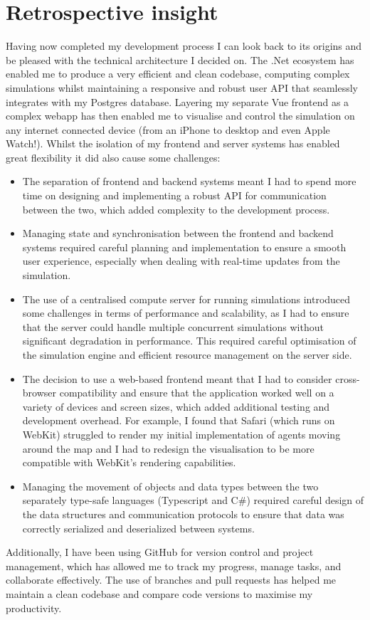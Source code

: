 \section{Retrospective insight}
Having now completed my development process I can look back to its origins and be pleased with the technical architecture I decided on. The .Net ecosystem has enabled me to produce a very efficient and clean codebase, computing complex simulations whilst maintaining a responsive and robust user API that seamlessly integrates with my Postgres database. Layering my separate Vue frontend as a complex webapp has then enabled me to visualise and control the simulation on any internet connected device (from an iPhone to desktop and even Apple Watch!). Whilst the isolation of my frontend and server systems has enabled great flexibility it did also cause some challenges: 
\begin{itemize}
    \item The separation of frontend and backend systems meant I had to spend more time on designing and implementing a robust API for communication between the two, which added complexity to the development process.
    \item Managing state and synchronisation between the frontend and backend systems required careful planning and implementation to ensure a smooth user experience, especially when dealing with real-time updates from the simulation.
    \item The use of a centralised compute server for running simulations introduced some challenges in terms of performance and scalability, as I had to ensure that the server could handle multiple concurrent simulations without significant degradation in performance. This required careful optimisation of the simulation engine and efficient resource management on the server side.
    \item The decision to use a web-based frontend meant that I had to consider cross-browser compatibility and ensure that the application worked well on a variety of devices and screen sizes, which added additional testing and development overhead. For example, I found that Safari (which runs on WebKit) struggled to render my initial implementation of agents moving around the map and I had to redesign the visualisation to be more compatible with WebKit's rendering capabilities.
    \item Managing the movement of objects and data types between the two separately type-safe languages (Typescript and C\#) required careful design of the data structures and communication protocols to ensure that data was correctly serialized and deserialized between systems.
\end{itemize}
Additionally, I have been using GitHub for version control and project management, which has allowed me to track my progress, manage tasks, and collaborate effectively. The use of branches and pull requests has helped me maintain a clean codebase and compare code versions to maximise my productivity. 

